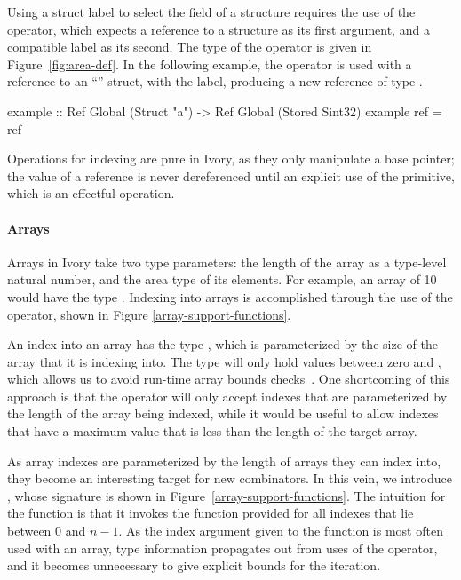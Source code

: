 Using a struct label to select the field of a structure requires the use of the
\cd{(\mytilde>)} operator, which expects a reference to a structure as its first
argument, and a compatible label as its second.  The type of the
\cd{(\mytilde>)} operator is given in Figure~\ref{fig:area-def}.  In the
following example, the \cd{(\mytilde>)} operator is used with a reference to an
``'' struct, with the  label, producing a new reference of type
.

\begin{code}
example :: Ref Global (Struct "a")
        -> Ref Global (Stored Sint32)
example ref = ref %
\end{code}

Operations for indexing are pure in Ivory, as they only manipulate a base
pointer; the value of a reference is never dereferenced until an explicit use of
the  primitive, which is an effectful operation.

\paragraph{Arrays}
Arrays in Ivory take two type parameters: the length of the array as a
type-level natural number, and the area type of its elements.  For example, an
array of 10  would have the type .  Indexing into arrays is accomplished through the use of the \cd{(!)}
operator, shown in Figure \ref{array-support-functions}.

An index into an array has the type , which is parameterized by the size
of the array that it is indexing into.  The  type will only hold
values between zero and , which allows us to avoid run-time array bounds
checks~\cite{memareas}.  One shortcoming of this approach is that the
\cd{(!)} operator will only accept indexes that are parameterized by the length
of the array being indexed, while it would be useful to allow indexes that have
a maximum value that is less than the length of the target array.

As array indexes are parameterized by the length of arrays they can index into,
they become an interesting target for new combinators.  In this vein, we
introduce , whose signature is shown in Figure~\ref{array-support-functions}.  The intuition for the  function is
that it invokes the function provided for all indexes that lie between $0$ and
$n - 1$.  As the index argument given to the function is most often used with an
array, type information propagates out from uses of the \cd{(!)} operator, and
it becomes unnecessary to give explicit bounds for the iteration.

